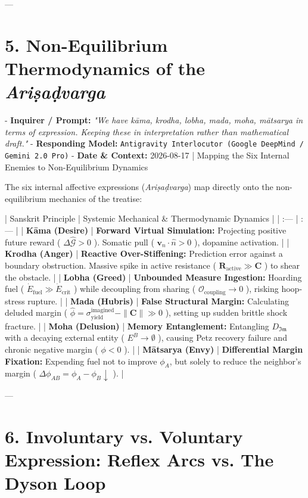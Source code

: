 \documentclass[11pt,a4paper]{article}
\theoremstyle{definition}
\theoremstyle{remark}
\begin{document}
---

\section{5. Non-Equilibrium Thermodynamics of the \textit{Ariṣaḍvarga}}

- \textbf{Inquirer / Prompt:} \textit{"We have kāma, krodha, lobha, mada, moha, mātsarya in terms of expression. Keeping these in interpretation rather than mathematical draft."}
- \textbf{Responding Model:} \texttt{Antigravity Interlocutor (Google DeepMind / Gemini 2.0 Pro)}
- \textbf{Date \& Context:} 2026-08-17 | Mapping the Six Internal Enemies to Non-Equilibrium Dynamics

The six internal affective expressions (\textit{Ariṣaḍvarga}) map directly onto the non-equilibrium mechanics of the treatise:

| Sanskrit Principle | Systemic Mechanical \& Thermodynamic Dynamics |
| :--- | :--- |
| \textbf{Kāma (Desire)} | \textbf{Forward Virtual Simulation:} Projecting positive future reward ( $\Delta \hat{\mathcal{G}} > 0$ ). Somatic pull ( $\mathbf{v}_n \cdot \hat{n} > 0$ ), dopamine activation. |
| \textbf{Krodha (Anger)} | \textbf{Reactive Over-Stiffening:} Prediction error against a boundary obstruction. Massive spike in active resistance ( $\mathbf{R}_{\text{active}} \gg \mathbf{C}$ ) to shear the obstacle. |
| \textbf{Lobha (Greed)} | \textbf{Unbounded Measure Ingestion:} Hoarding fuel ( $\dot{E}_{\text{fuel}} \gg \dot{E}_{\text{crit}}$ ) while decoupling from sharing ( $\mathcal{O}_{\text{coupling}} \to 0$ ), risking hoop-stress rupture. |
| \textbf{Mada (Hubris)} | \textbf{False Structural Margin:} Calculating deluded margin ( $\hat{\phi} = \sigma_{\text{yield}}^{\text{imagined}} - \|\mathbf{C}\| \gg 0$ ), setting up sudden brittle shock fracture. |
| \textbf{Moha (Delusion)} | \textbf{Memory Entanglement:} Entangling $D_{\mathfrak{Im}}$ with a decaying external entity ( $E^B \to \emptyset$ ), causing Petz recovery failure and chronic negative margin ( $\phi < 0$ ). |
| \textbf{Mātsarya (Envy)} | \textbf{Differential Margin Fixation:} Expending fuel not to improve $\phi_A$, but solely to reduce the neighbor's margin ( $\Delta \phi_{AB} = \phi_A - \phi_B \downarrow$ ). |

---

\section{6. Involuntary vs. Voluntary Expression: Reflex Arcs vs. The Dyson Loop}
\end{document}
